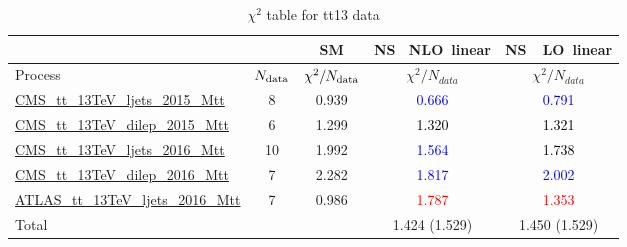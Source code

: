 \documentclass{article}
\begin{document}
\begin{table}[H]
\centering
\begin{tabular}{|l|c|c|c|c|}
\hline
 \multicolumn{2}{|c|}{} & SM& \rm NS \ NLO\ linear& \rm NS\ \ LO\ linear\\ \hline
Process & $N_{\rm data}$ & $\chi^ 2/N_{\rm data}$& $\chi^ 2/N_{data}$& $\chi^ 2/N_{data}$\\ \hline
\href{https://arxiv.org/abs/1610.04191}{CMS_tt_13TeV_ljets_2015_Mtt} & 8 & 0.939 & \textcolor{blue}                            {0.666} & \textcolor{blue}                            {0.791} \\ \hline
\href{https://arxiv.org/abs/1708.07638}{CMS_tt_13TeV_dilep_2015_Mtt} & 6 & 1.299 & \textcolor{black}                            {1.320} & \textcolor{black}                            {1.321} \\ \hline
\href{https://arxiv.org/abs/1803.08856}{CMS_tt_13TeV_ljets_2016_Mtt} & 10 & 1.992 & \textcolor{blue}                            {1.564} & \textcolor{black}                            {1.738} \\ \hline
\href{https://arxiv.org/abs/1811.06625}{CMS_tt_13TeV_dilep_2016_Mtt} & 7 & 2.282 & \textcolor{blue}                            {1.817} & \textcolor{blue}                            {2.002} \\ \hline
\href{https://arxiv.org/abs/1908.07305}{ATLAS_tt_13TeV_ljets_2016_Mtt} & 7 & 0.986 & \textcolor{red}                            {1.787} & \textcolor{red}                            {1.353} \\ \hline
\hline Total & &  & 1.424 (1.529) & 1.450 (1.529) \\ \hline
\end{tabular}
\caption{$\chi^2$ table for tt13 data}
\end{table}
\end{document}
